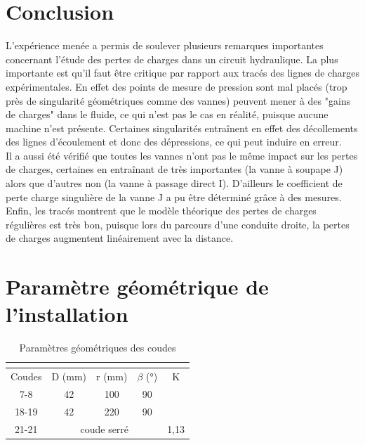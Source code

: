 \documentclass[12pt, a4paper, twoside]{article} %
\begin{document}
\section{Conclusion}

L'expérience menée a permis de soulever plusieurs remarques importantes concernant l'étude des pertes de charges dans un circuit hydraulique. La plus importante est qu'il faut être critique par rapport aux tracés des lignes de charges expérimentales. En effet des points de mesure de pression sont mal placés (trop près de singularité géométriques comme des vannes) peuvent mener à des "gains de charges" dans le fluide, ce qui n'est pas le cas en réalité, puisque aucune machine n'est présente. Certaines singularités entraînent en effet des décollements des lignes d'écoulement et donc des dépressions, ce qui peut induire en erreur. \\
Il a aussi été vérifié que toutes les vannes n'ont pas le même impact sur les pertes de charges, certaines en entraînant de très importantes (la vanne à soupape J) alors que d'autres non (la vanne à passage direct I). D'ailleurs le coefficient de perte charge singulière de la vanne J a pu être déterminé grâce à des mesures.
\\Enfin, les tracés montrent que le modèle théorique des pertes de charges régulières est très bon, puisque lors du parcours d'une conduite droite, la pertes de charges augmentent linéairement avec la distance.





\clearpage

\appendix

\section{Paramètre géométrique de l'installation }
\label{Annexe:paramètre_géométrique}

\begin{table}[H]
    \centering
       \caption{Paramètres géométriques des coudes }
    \begin{tabular}{|c|c|c|c|c|}
    \multicolumn{5}{c}{ }  \\ 
    \hline 
        Coudes & D (mm) & r (mm) & $\beta$ (°) & K  \\
        \hline 
        7-8 & 42  & 100 & 90 &  \\
         \hline
         18-19 & 42 & 220 & 90 &  \\ 
         \hline 
         21-21 & \multicolumn{3}{c|}{coude serré} & 1,13 \\ 
         \hline 
    \end{tabular}
    \label{tab:parametre_coude}
\end{table}
\end{document}

